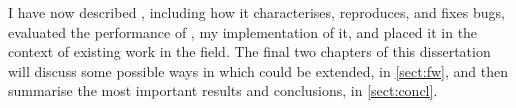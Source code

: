I have now described {\technique}, including how it characterises,
reproduces, and fixes bugs, evaluated the performance of
{\implementation}, my implementation of it, and placed it in the
context of existing work in the field.  The final two chapters of this
dissertation will discuss some possible ways in which {\technique}
could be extended, in \autoref{sect:fw}, and then summarise the most
important results and conclusions, in \autoref{sect:concl}.

